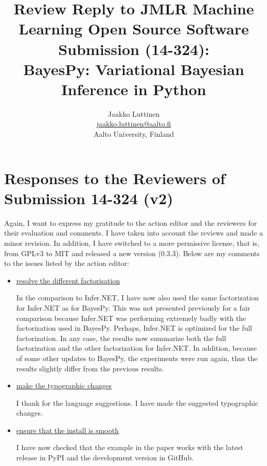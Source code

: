 \documentclass{article}
\title{Review Reply to JMLR Machine Learning Open Source Software Submission (14-324):\\
BayesPy: Variational Bayesian Inference in Python}
\author{Jaakko Luttinen\\
  \url{jaakko.luttinen@aalto.fi}\\
    Aalto University, Finland}
\begin{document}
\maketitle

\section{Responses to the Reviewers of Submission 14-324 (v2)}

Again, I want to express my gratitude to the action editor and the reviewers for
their evaluation and comments.  I have taken into account the reviews and made a
minor revision.  In addition, I have switched to a more permissive license, that
is, from GPLv3 to MIT and released a new version (0.3.3).  Below are my comments
to the issues listed by the action editor:

\begin{itemize}

\item \underline{resolve the different factorisation}

  In the comparison to Infer.NET, I have now also used the same factorization
  for Infer.NET as for BayesPy.  This was not presented previously for a fair
  comparison because Infer.NET was performing extremely badly with the
  factorization used in BayesPy.  Perhaps, Infer.NET is optimized for the full
  factorization.  In any case, the results now summarize both the full
  factorization and the other factorization for Infer.NET.  In addition, because
  of some other updates to BayesPy, the experiments were run again, thus the
  results slightly differ from the previous results.


\item \underline{make the typographic changes}

  I thank for the language suggestions.  I have made the suggested typographic
  changes.
  

\item \underline{ensure that the install is smooth}

  I have now checked that the example in the paper works with the latest release
  in PyPI and the development version in GitHub.

  
\end{itemize}
\end{document}
